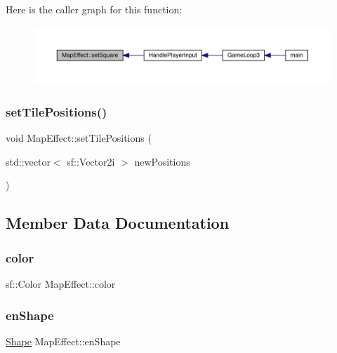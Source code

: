 Here is the caller graph for this function\+:
\nopagebreak
\begin{figure}[H]
\begin{center}
\leavevmode
\includegraphics[width=350pt]{class_map_effect_a4c382be68e0b9dae8fb1f216c8cfc9a6_icgraph}
\end{center}
\end{figure}
\mbox{\label{class_map_effect_af79dd085aefbd1cdd92e9e9aa695592a}} 
\subsubsection{\texorpdfstring{set\+Tile\+Positions()}{setTilePositions()}}
{\footnotesize\ttfamily void Map\+Effect\+::set\+Tile\+Positions (\begin{DoxyParamCaption}\item[{std\+::vector$<$ sf\+::\+Vector2i $>$}]{new\+Positions }\end{DoxyParamCaption})}



\subsection{Member Data Documentation}
\mbox{\label{class_map_effect_ae542c1aef75e386b30ec544c2dd411d3}} 
\subsubsection{\texorpdfstring{color}{color}}
{\footnotesize\ttfamily sf\+::\+Color Map\+Effect\+::color}

\mbox{\label{class_map_effect_a3bf3a8ffe6c838dad83356be63b986f5}} 
\subsubsection{\texorpdfstring{en\+Shape}{enShape}}
{\footnotesize\ttfamily \mbox{\hyperlink{_map_effect_8hpp_a55b506070847a13554f8b879c1bfb37c}{Shape}} Map\+Effect\+::en\+Shape\hspace{0.3cm}{\ttfamily [private]}}

